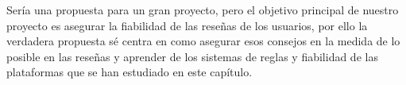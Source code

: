 Sería una propuesta para un gran proyecto, pero el objetivo principal de nuestro proyecto es asegurar la fiabilidad de las reseñas de los usuarios, por ello la verdadera propuesta sé centra en como asegurar esos consejos en la medida de lo posible en las reseñas y aprender de los sistemas de reglas y fiabilidad de las plataformas que se han estudiado en este capítulo. 

